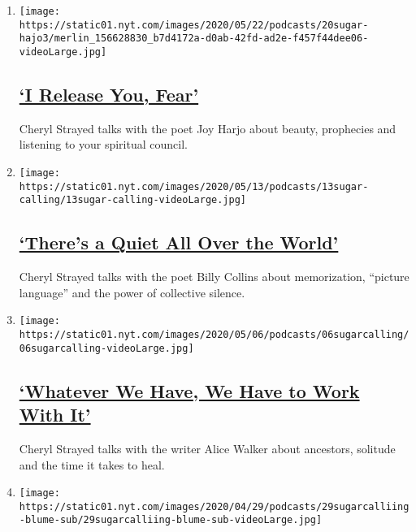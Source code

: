 \begin{enumerate}
\def\labelenumi{\arabic{enumi}.}
\item
  \texttt{[image: https://static01.nyt.com/images/2020/05/22/podcasts/20sugar-hajo3/merlin\_156628830\_b7d4172a-d0ab-42fd-ad2e-f457f44dee06-videoLarge.jpg]}

  \hypertarget{i-release-you-fear}{%
  \subsection{\texorpdfstring{\href{/2020/05/20/podcasts/sugar-calling-joy-harjo-poetry-virus.html}{`I
  Release You,
  Fear'}}{`I Release You, Fear'}}\label{i-release-you-fear}}

  Cheryl Strayed talks with the poet Joy Harjo about beauty, prophecies
  and listening to your spiritual council.
\item
  \texttt{[image: https://static01.nyt.com/images/2020/05/13/podcasts/13sugar-calling/13sugar-calling-videoLarge.jpg]}

  \hypertarget{theres-a-quiet-all-over-the-world}{%
  \subsection{\texorpdfstring{\href{/2020/05/13/podcasts/sugar-calling-billy-collins-poetry-virus.html}{`There's
  a Quiet All Over the
  World'}}{`There's a Quiet All Over the World'}}\label{theres-a-quiet-all-over-the-world}}

  Cheryl Strayed talks with the poet Billy Collins about memorization,
  ``picture language'' and the power of collective silence.
\item
  \texttt{[image: https://static01.nyt.com/images/2020/05/06/podcasts/06sugarcalling/06sugarcalling-videoLarge.jpg]}

  \hypertarget{whatever-we-have-we-have-to-work-with-it}{%
  \subsection{\texorpdfstring{\href{/2020/05/06/podcasts/sugar-calling-alice-walker-quarantine-virus.html}{`Whatever
  We Have, We Have to Work With
  It'}}{`Whatever We Have, We Have to Work With It'}}\label{whatever-we-have-we-have-to-work-with-it}}

  Cheryl Strayed talks with the writer Alice Walker about ancestors,
  solitude and the time it takes to heal.
\item
  \texttt{[image: https://static01.nyt.com/images/2020/04/29/podcasts/29sugarcalliing-blume-sub/29sugarcalliing-blume-sub-videoLarge.jpg]}


\end{enumerate}
